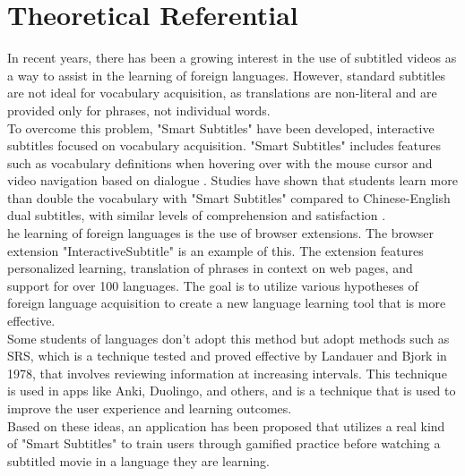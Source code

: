 \documentclass[12pt]{article}
\begin{document}
\section{Theoretical Referential}
In recent years, there has been a growing interest in the use of subtitled videos as a way to assist in the learning of foreign languages. However, standard subtitles are not ideal for vocabulary acquisition, as translations are non-literal and are provided only for phrases, not individual words. \\
To overcome this problem, "Smart Subtitles" have been developed, interactive subtitles focused on vocabulary acquisition. "Smart Subtitles" includes features such as vocabulary definitions when hovering over with the mouse cursor and video navigation based on dialogue \cite{Kovacs13}. Studies have shown that students learn more than double the vocabulary with "Smart Subtitles" compared to Chinese-English dual subtitles, with similar levels of comprehension and satisfaction \cite{Kovacs14}. \\ he learning of foreign languages is the use of browser extensions. The browser extension "InteractiveSubtitle" \cite{ElBatanony21} is an example of this. The extension features personalized learning, translation of phrases in context on web pages, and support for over 100 languages. The goal is to utilize various hypotheses of foreign language acquisition to create a new language learning tool that is more effective. \\ 
Some students of languages don't adopt this method but adopt methods such as SRS, which is a technique tested and proved effective by Landauer and Bjork in 1978, that involves reviewing information at increasing intervals. This technique is used in apps like Anki, Duolingo, and others, and is a technique that is used to improve the user experience and learning outcomes. \\
Based on these ideas, an application has been proposed that utilizes a real kind of "Smart Subtitles" to train users through gamified practice before watching a subtitled movie in a language they are learning.   \\
\end{document}
